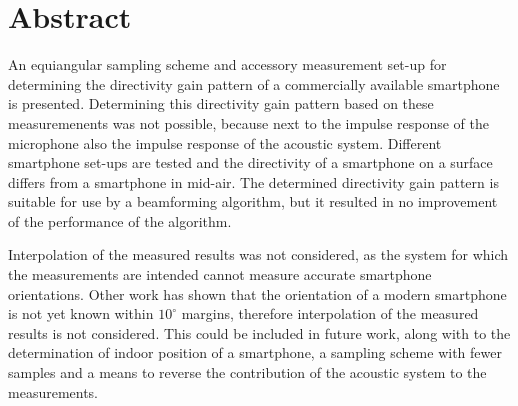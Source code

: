 \chapter*{Abstract}

An equiangular sampling scheme and accessory measurement set-up for determining the directivity gain pattern of a commercially available smartphone is presented.
Determining this directivity gain pattern based on these measuremenents was not possible, because next to the impulse response of the microphone also the impulse response of the acoustic system.
Different smartphone set-ups are tested and the directivity of a smartphone on a surface differs from a smartphone in mid-air.
The determined directivity gain pattern is suitable for use by a beamforming algorithm, but it resulted in no improvement of the performance of the algorithm.

Interpolation of the measured results was not considered, as the system for which the measurements are intended cannot measure accurate smartphone orientations.
Other work has shown that the orientation of a modern smartphone is not yet known within $10^\circ$ margins, therefore interpolation of the measured results is not considered.
This could be included in future work, along with to the determination of indoor position of a smartphone, a sampling scheme with fewer samples and a means to reverse the contribution of the acoustic system to the measurements.